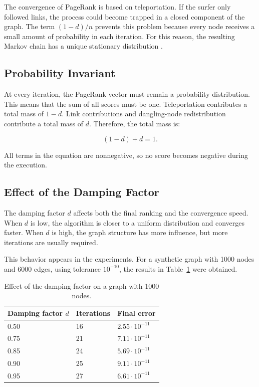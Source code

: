 \documentclass[runningheads]{llncs}
\begin{document}
The convergence of PageRank is based on teleportation. If the surfer only followed links, the process could become trapped in a closed component of the graph. The term \((1-d)/n\) prevents this problem because every node receives a small amount of probability in each iteration. For this reason, the resulting Markov chain has a unique stationary distribution \cite{langville2004deeper,langville2012google}.

\subsection{Probability Invariant}

At every iteration, the PageRank vector must remain a probability distribution. This means that the sum of all scores must be one. Teleportation contributes a total mass of \(1-d\). Link contributions and dangling-node redistribution contribute a total mass of \(d\). Therefore, the total mass is:

\begin{equation}
(1-d)+d=1.
\end{equation}

All terms in the equation are nonnegative, so no score becomes negative during the execution.

\subsection{Effect of the Damping Factor}

The damping factor \(d\) affects both the final ranking and the convergence speed. When \(d\) is low, the algorithm is closer to a uniform distribution and converges faster. When \(d\) is high, the graph structure has more influence, but more iterations are usually required.

This behavior appears in the experiments. For a synthetic graph with 1000 nodes and 6000 edges, using tolerance \(10^{-10}\), the results in Table~\ref{tab:damping} were obtained.

\begin{table}
\caption{Effect of the damping factor on a graph with 1000 nodes.}\label{tab:damping}
\begin{tabular}{|l|l|l|}
\hline
Damping factor \(d\) & Iterations & Final error\\
\hline
0.50 & 16 & \(2.55\cdot 10^{-11}\)\\
0.75 & 21 & \(7.11\cdot 10^{-11}\)\\
0.85 & 24 & \(5.69\cdot 10^{-11}\)\\
0.90 & 25 & \(9.11\cdot 10^{-11}\)\\
0.95 & 27 & \(6.61\cdot 10^{-11}\)\\
\hline
\end{tabular}
\end{table}
\end{document}
